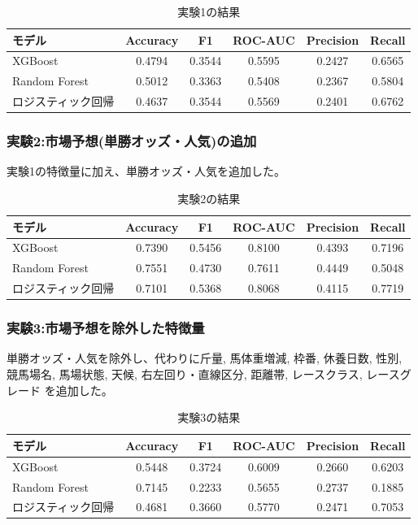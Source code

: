 \documentclass[dvipdfmx, a4paper, 11pt, titlepage]{jsarticle}
\begin{document}
\begin{table}[H]
  \centering
  \caption{実験1の結果}
  \label{tab:exp1}
  \begin{tabular}{lccccc}
    \toprule
    モデル & Accuracy & F1 & ROC-AUC & Precision & Recall \\
    \midrule
    XGBoost           & 0.4794 & 0.3544 & 0.5595 & 0.2427 & 0.6565 \\
    Random Forest     & 0.5012 & 0.3363 & 0.5408 & 0.2367 & 0.5804 \\
    ロジスティック回帰 & 0.4637 & 0.3544 & 0.5569 & 0.2401 & 0.6762 \\
    \bottomrule
  \end{tabular}
\end{table}

\subsubsection{実験2:市場予想(単勝オッズ・人気)の追加}

実験1の特徴量に加え、単勝オッズ・人気を追加した。

\begin{table}[H]
  \centering
  \caption{実験2の結果}
  \label{tab:exp2}
  \begin{tabular}{lccccc}
    \toprule
    モデル & Accuracy & F1 & ROC-AUC & Precision & Recall \\
    \midrule
    XGBoost           & 0.7390 & 0.5456 & 0.8100 & 0.4393 & 0.7196 \\
    Random Forest     & 0.7551 & 0.4730 & 0.7611 & 0.4449 & 0.5048 \\
    ロジスティック回帰 & 0.7101 & 0.5368 & 0.8068 & 0.4115 & 0.7719 \\
    \bottomrule
  \end{tabular}
\end{table}

\subsubsection{実験3:市場予想を除外した特徴量}

単勝オッズ・人気を除外し、代わりに斤量, 馬体重増減, 枠番, 休養日数, 性別,
競馬場名, 馬場状態, 天候, 右左回り・直線区分, 距離帯, レースクラス, レースグレード
を追加した。

\begin{table}[H]
  \centering
  \caption{実験3の結果}
  \label{tab:exp3}
  \begin{tabular}{lccccc}
    \toprule
    モデル & Accuracy & F1 & ROC-AUC & Precision & Recall \\
    \midrule
    XGBoost           & 0.5448 & 0.3724 & 0.6009 & 0.2660 & 0.6203 \\
    Random Forest     & 0.7145 & 0.2233 & 0.5655 & 0.2737 & 0.1885 \\
    ロジスティック回帰 & 0.4681 & 0.3660 & 0.5770 & 0.2471 & 0.7053 \\
    \bottomrule
  \end{tabular}
\end{table}
\end{document}
